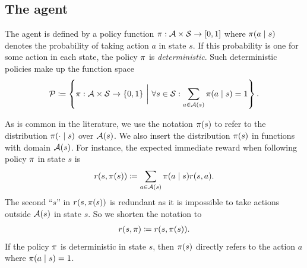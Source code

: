 

% 



\subsection{The agent}

The agent is defined by a policy function $\pi : \mathcal{A} \times \mathcal{S} \to [0,1]$ where $\pi(a \mid s)$ denotes the probability of taking action $a$ in state $s$.
If this probability is one for some action in each state, the policy $\pi$ is \textit{deterministic}.
Such deterministic policies make up the function space
\begin{align}
    \mathcal{P} \coloneqq 
    \left\{ \pi : \mathcal{A} \times \mathcal{S} \to \{ 0,1 \}
    \ \bigg| \
    \forall s \in \mathcal{S} : \sum_{a \in \mathcal{A}(s)} \pi(a \mid s) = 1 
    \right\} .
\end{align}


\begin{remark}
As is common in the literature, we use the notation $\pi(s)$ to refer to the distribution $\pi(\cdot \mid s)$ over $\mathcal{A}(s)$.
We also insert the distribution $\pi(s)$ in functions with domain $\mathcal{A}(s)$.
For instance, the expected immediate reward when following policy $\pi$ in state $s$ is
\begin{align*}
    r(s, \pi(s)) \coloneqq \sum_{a \in \mathcal{A}(s)} \pi(a \mid s) r(s, a) .
\end{align*}
The second ``$s$'' in $r(s, \pi(s))$ is redundant as it is impossible to take actions outside $\mathcal{A}(s)$ in state $s$. So we shorten the notation to
\begin{align*}
    r(s, \pi) \coloneqq r(s, \pi(s)).
\end{align*}
If the policy $\pi$ is deterministic in state $s$, then $\pi(s)$ directly refers to the action $a$ where $\pi(a \mid s) = 1$.
\end{remark}


